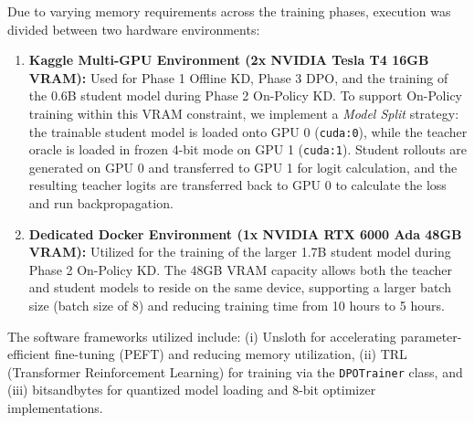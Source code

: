 Due to varying memory requirements across the training phases, execution was divided between two hardware environments:
\begin{enumerate}
    \item \textbf{Kaggle Multi-GPU Environment (2x NVIDIA Tesla T4 16GB VRAM):} Used for Phase 1 Offline KD, Phase 3 DPO, and the training of the 0.6B student model during Phase 2 On-Policy KD. To support On-Policy training within this VRAM constraint, we implement a \textit{Model Split} strategy: the trainable student model is loaded onto GPU 0 (\texttt{cuda:0}), while the teacher oracle is loaded in frozen 4-bit mode on GPU 1 (\texttt{cuda:1}). Student rollouts are generated on GPU 0 and transferred to GPU 1 for logit calculation, and the resulting teacher logits are transferred back to GPU 0 to calculate the loss and run backpropagation.
    \item \textbf{Dedicated Docker Environment (1x NVIDIA RTX 6000 Ada 48GB VRAM):} Utilized for the training of the larger 1.7B student model during Phase 2 On-Policy KD. The 48GB VRAM capacity allows both the teacher and student models to reside on the same device, supporting a larger batch size (batch size of 8) and reducing training time from 10 hours to 5 hours.
\end{enumerate}

The software frameworks utilized include: (i) Unsloth for accelerating parameter-efficient fine-tuning (PEFT) and reducing memory utilization, (ii) TRL (Transformer Reinforcement Learning) for training via the \texttt{DPOTrainer} class, and (iii) bitsandbytes for quantized model loading and 8-bit optimizer implementations.
